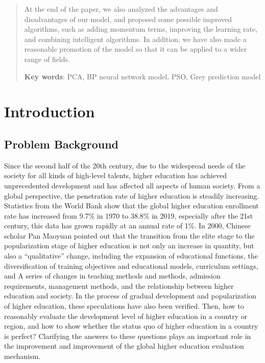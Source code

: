 \documentclass[12pt]{article}  %
\begin{document}
\begin{abstract}
At the end of the paper, we also analyzed the advantages and disadvantages of our model, and proposed some possible improved algorithms, such as adding momentum terms, improving the learning rate, and combining intelligent algorithms. In addition, we have also made a reasonable promotion of the model so that it can be applied to a wider range of fields.
\vspace{8mm}

\textbf{Key words}: PCA, BP neural network model, PSO, Grey prediction model


    

\end{abstract}

\maketitle  %
\tableofcontents  %


\section{Introduction}
\subsection{Problem Background}
Since the second half of the 20th century, due to the widespread needs of the society for all kinds of high-level talents, higher education has achieved unprecedented development and has affected all aspects of human society. From a global perspective, the penetration rate of higher education is steadily increasing. Statistics from the World Bank show that the global higher education enrollment rate has increased from 9.7\% in 1970 to 38.8\% in 2019, especially after the 21st century, this data has grown rapidly at an annual rate of 1\%. In 2000, Chinese scholar Pan Maoyuan pointed out that the transition from the elite stage to the popularization stage of higher education is not only an increase in quantity, but also a “qualitative” change, including the expansion of educational functions, the diversification of training objectives and educational models, curriculum settings, and A series of changes in teaching methods and methods, admission requirements, management methods, and the relationship between higher education and society. In the process of gradual development and popularization of higher education, these speculations have also been verified. Then, how to reasonably evaluate the development level of higher education in a country or region, and how to show whether the status quo of higher education in a country is perfect? Clarifying the answers to these questions plays an important role in the improvement and improvement of the global higher education evaluation mechanism.
\end{document}
